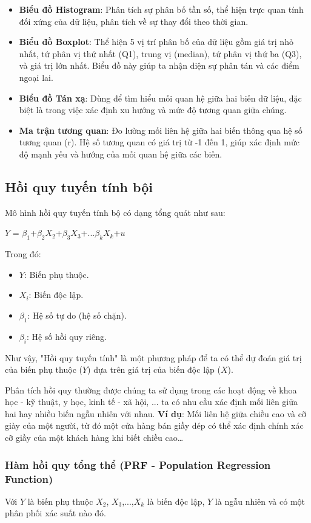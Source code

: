 \begin{itemize} \item \textbf{Biểu đồ Histogram}: Phân tích sự phân bố tần số, thể hiện trực quan tính đối xứng của dữ liệu, phân tích về sự thay đổi theo thời gian. \item \textbf{Biểu đồ Boxplot}: Thể hiện 5 vị trí phân bố của dữ liệu gồm giá trị nhỏ nhất, tứ phân vị thứ nhất (Q1), trung vị (median), tứ phân vị thứ ba (Q3), và giá trị lớn nhất. Biểu đồ này giúp ta nhận diện sự phân tán và các điểm ngoại lai. \item \textbf{Biểu đồ Tán xạ}: Dùng để tìm hiểu mối quan hệ giữa hai biến dữ liệu, đặc biệt là trong việc xác định xu hướng và mức độ tương quan giữa chúng. \item \textbf{Ma trận tương quan}: Đo lường mối liên hệ giữa hai biến thông qua hệ số tương quan (r). Hệ số tương quan có giá trị từ -1 đến 1, giúp xác định mức độ mạnh yếu và hướng của mối quan hệ giữa các biến. \end{itemize}
\subsection{Hồi quy tuyến tính bội}
Mô hình hồi quy tuyến tính bộ có dạng tổng quát như sau:\
\begin{center}
    $Y$ = $\beta_1$+$\beta_2$$X_2$+$\beta_3$$X_3$+...$\beta_k$$X_k$+$u$
\end{center}
Trong đó:
\begin{itemize}
    \item[+] $Y$: Biến phụ thuộc.
    \item[+] $X_i$: Biến độc lập.
    \item[+] $\beta_1$: Hệ số tự do (hệ số chặn).
    \item[+] $\beta_i$: Hệ số hồi quy riêng.
\end{itemize}

Như vậy, "Hồi quy tuyến tính" là một phương pháp để ta có thể dự đoán giá trị của biến phụ thuộc ($Y$) dựa trên giá trị của biến độc lập ($X$).

Phân tích hồi quy thường được chúng ta sử dụng trong các hoạt động về khoa học - kỹ thuật, y học, kinh tế - xã hội, ... ta có nhu cầu xác định mối liên giữa hai hay nhiều biến ngẫu nhiên với nhau.
\textbf{Ví dụ}: Mối liên hệ giữa chiều cao và cỡ giày của một người, từ đó một cửa hàng bán giầy dép có thể xác định chính xác cỡ giầy của một khách hàng khi biết chiều cao…
\subsubsection{Hàm hồi quy tổng thể (PRF - Population Regression Function)}
Với $Y$ là biến phụ thuộc $X_2$, $X_3$,...,$X_k$ là biến độc lập, $Y$ là ngẫu nhiên và có một phân phối xác suất nào đó.

